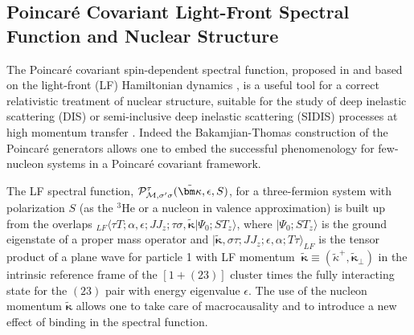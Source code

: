 \subsection{Poincar\'e Covariant Light-Front Spectral Function and Nuclear Structure}
{The Poincar\'e covariant spin-dependent spectral function, proposed in \cite{LFSF} and based on  the light-front (LF) Hamiltonian dynamics \cite{Dirac,KP},  is a useful tool for a correct relativistic treatment  of nuclear structure, suitable for the study of deep inelastic scattering (DIS) or semi-inclusive deep inelastic scattering (SIDIS) processes at high momentum transfer \cite{mar,sid1,sid2}.}
 {Indeed the Bakamjian-Thomas construction \cite{BT} of the Poincar\'e generators 
  allows one to embed the successful phenomenology for few-nucleon systems in a
Poincar\'e covariant framework.}

The LF spectral function, ${{\cal P}^{\tau}_{{\cal M},\sigma'\sigma}({ \tilde {\bm \kappa}},\epsilon,S)}$,
for a three-fermion system with polarization $S$ (as the $^3\mathrm{He}$ or a nucleon in valence approximation) is built up from the overlaps $_{LF}\langle  \tau T ; 
\alpha,\epsilon ;J J_{z}; \tau\sigma,\tilde{\bm \kappa}|\Psi_{0}; S T_z \rangle$, where $|\Psi_{0}; S T_z \rangle$ is the ground eigenstate of a proper mass operator \cite{LFSF} and 
$|\tilde{\bm \kappa}, \sigma \tau; J_{} J_{z}; \epsilon,\alpha;T \tau \rangle_{LF}$ is the tensor product of a plane wave for particle 1 with LF momentum $~ \tilde{\bm \kappa} \equiv (\tilde{\kappa}^+,{\tilde{\bm \kappa}_\perp})$ in the {{intrinsic reference frame of the $[1+(23)]$ cluster}} 
 times the fully interacting  state for {the} $(23)$ pair with  energy eigenvalue $\epsilon$.
{{The use of the nucleon momentum {{${\tilde{\bm \kappa}}$}}
   allows one  to take care of macrocausality \cite{KP} and  to introduce 
   {{a new effect of binding in the spectral function.}}}}

